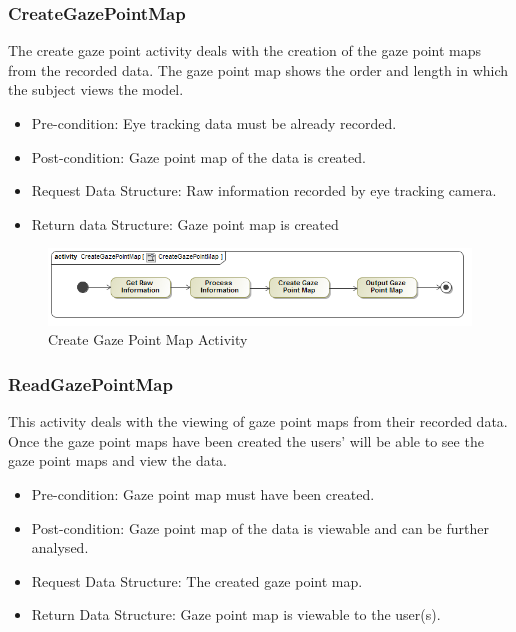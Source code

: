 	\subsubsection{CreateGazePointMap}
The create gaze point activity deals with the creation of the gaze point maps from the recorded data. The gaze point map shows the order and length in which the subject views the model.
	\begin{itemize}
		\item Pre-condition: Eye tracking data must be already recorded.
		\item Post-condition: Gaze point map of the data is created.
		\item Request Data Structure: Raw information recorded by eye tracking camera.
		\item Return data Structure: Gaze point map is created
	\end{itemize}
	\begin{figure}[!ht]
		\centering
		\includegraphics[scale=0.5,width=15cm,keepaspectratio]{Diagrams/Activity_Diagram__CreateGazePointMap__CreateGazePointMap.png}
		\caption{Create Gaze Point Map Activity}
	\end{figure}
	
	\subsubsection{ReadGazePointMap}
	This activity deals with the viewing of gaze point maps from their recorded data. Once the gaze point maps have been created the users' will be able to see the gaze point maps and view the data.
	\begin{itemize}
		\item Pre-condition: Gaze point map must have been created.
		\item Post-condition: Gaze point map of the data is viewable and can be further analysed.
		\item Request Data Structure: The created gaze point map.
		\item Return Data Structure: Gaze point map is viewable to the user(s).
	\end{itemize}
	
